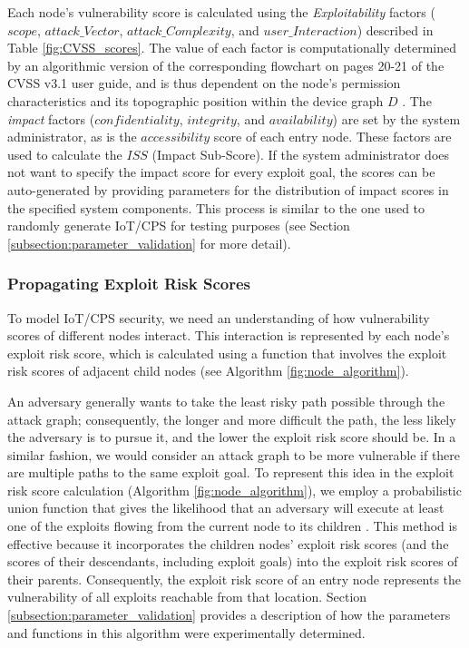 \documentclass[10pt,journal,compsoc]{IEEEtran}
\begin{document}
Each node's vulnerability score is calculated using the \textit{Exploitability} factors ($scope$, $attack\_Vector$, $attack\_Complexity$, and $user\_Interaction$) described in 
Table \ref{fig:CVSS_scores}. The value of each factor is computationally 
determined by an algorithmic version of the corresponding flowchart on pages 20-21 of the CVSS 
v3.1 user guide, and is thus dependent on the node's permission characteristics and its topographic 
position within the device graph $D$ \cite{first2019userguide}. The \textit{impact} factors ($confidentiality$, $integrity$, and 
$availability$) are set by the system administrator, as is the $accessibility$ score of 
each entry node. These factors are used to calculate the $ISS$ (Impact Sub-Score). If the system administrator does not want to specify the impact score for every exploit goal, the scores can be auto-generated by providing parameters for the distribution of impact scores in the specified system components. This process is similar to the one used to randomly generate IoT/CPS for testing purposes (see Section \ref{subsection:parameter_validation} for more detail).

\subsubsection{Propagating Exploit Risk Scores}
\label{subsubsection:propagate_exploit_risk_scores}

To model IoT/CPS security, we need an understanding of how vulnerability scores of 
different nodes interact. This interaction is represented by each node's exploit risk
score, which is calculated using a function that involves the exploit risk scores of 
adjacent child nodes (see Algorithm \ref{fig:node_algorithm}). 

\par An adversary generally wants to take the least risky path possible through the attack graph; 
consequently, the longer and more difficult the path, the less likely the adversary is to pursue it,
and the lower the exploit risk score should be. In a similar fashion, we would consider an 
attack graph to be more vulnerable if there are multiple paths to the same exploit goal. To represent this 
idea in the exploit risk score calculation (Algorithm \ref{fig:node_algorithm}), we employ a probabilistic union function that 
gives the likelihood that an adversary will execute at least one of the exploits flowing from the current node to its children \cite{aksu2017}. This method is effective because it incorporates the
children nodes' exploit risk scores (and the scores of their descendants, including 
exploit goals) into the exploit risk scores of their parents. Consequently, the exploit risk score of an entry node represents the vulnerability of all exploits
reachable from that location. Section \ref{subsection:parameter_validation} provides a description of how the parameters and functions in this algorithm were experimentally determined.
\end{document}

